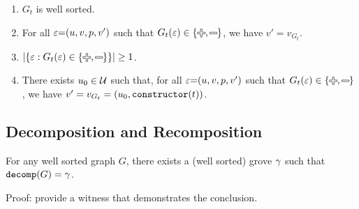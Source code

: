 \begin{definition}
\begin{itemize}
\begin{enumerate}
        \item $G_t$ is well sorted.
        \item For all $\varepsilon{=}(u, v, p, v')$ such that $G_t(\e) \in \SetOf{\Plus, \Minus}$,
          we have $v' = v_{G_t}$.
        \item $\SizeOf{\SetOf{\e \SuchThat{G_t(\e) \in \SetOf{\Plus, \Minus}}}} \geq 1$.
        \item There exists $u_0 \in \mathcal{U}$ such that,
          for all $\varepsilon{=}(u, v, p, v')$ such that $G_t(\e) \in \SetOf{\Plus, \Minus}$,
          we have $v' = v_{G_t} = (u_0, \operatorname{\texttt{constructor}}\mathopen{}\left(t\right)\mathclose{})$.
      \end{enumerate}
  \end{itemize}
\end{definition}



\subsection{Decomposition and Recomposition}

\begin{theorem}
  For any well sorted graph $G$,
  there exists a (well sorted) grove $\gamma$
  such that $\operatorname{\texttt{decomp}}\mathopen{}\left(G\right)\mathclose{} = \gamma$.
\end{theorem}

Proof: provide a witness that demonstrates the conclusion.



\figureDecompositionDefHelpersContent

